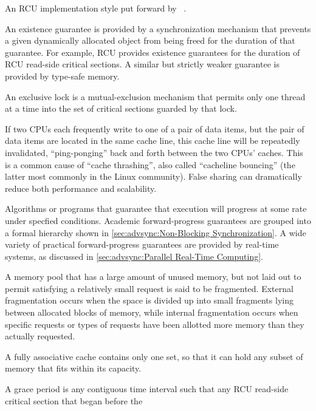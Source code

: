 \begin{description}
	An RCU implementation style put forward by
	~\cite{KeirAnthonyFraserPhD,UCAM-CL-TR-579,KeirFraser2007withoutLocks}.
\item[\IXG{Existence Guarantee}:]
	An existence guarantee is provided by a synchronization mechanism
	that prevents a given dynamically allocated object from being
	freed for the duration of that guarantee.
	For example, RCU provides existence guarantees for the duration
	of RCU read-side critical sections.
	A similar but strictly weaker guarantee is provided by
	type-safe memory.
\item[\IXGh{Exclusive}{Lock}:]
	An exclusive lock is a mutual-exclusion mechanism that
	permits only one thread at a time into the
	set of critical sections guarded by that lock.
\item[\IXG{False Sharing}:]
	If two CPUs each frequently write to one of a pair of data items,
	but the pair of data items are located in the same cache line,
	this cache line will be repeatedly invalidated, ``ping-ponging''
	back and forth between the two CPUs' caches.
	This is a common cause of ``cache thrashing'', also called
	``cacheline bouncing'' (the latter most commonly in the Linux
	community).
	False sharing can dramatically reduce both performance and
	scalability.
\item[\IXG{Forward-Progress Guarantee}:]
	Algorithms or programs that guarantee that execution will
	progress at some rate under specfied conditions.
	Academic forward-progress guarantees are grouped into a
	formal hierarchy shown in
	\cref{sec:advsync:Non-Blocking Synchronization}.
	A wide variety of practical forward-progress guarantees are
	provided by real-time systems, as discussed in
	\cref{sec:advsync:Parallel Real-Time Computing}.
\item[\IXG{Fragmentation}:]
	A memory pool that has a large amount of unused memory, but
	not laid out to permit satisfying a relatively small request
	is said to be fragmented.
	External fragmentation occurs when the space is divided up
	into small fragments lying between allocated blocks of memory,
	while internal fragmentation occurs when specific requests or
	types of requests have been allotted more memory than they
	actually requested.
\item[\IXGh{Fully Associative}{Cache}:]
	A fully associative cache contains only
	one set, so that it can hold any subset of
	memory that fits within its capacity.
\item[\IXG{Grace Period}:]
	A grace period is any contiguous time interval such that
	any RCU read-side critical section that began before the

\end{description}
